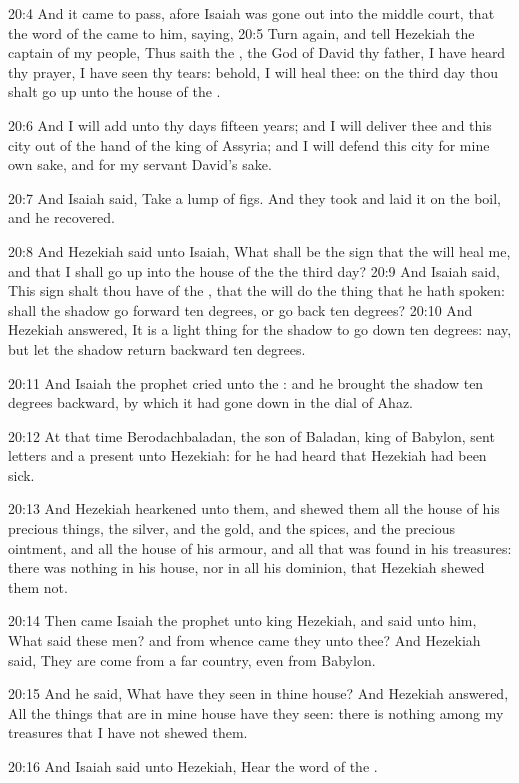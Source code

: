 20:4 And it came to pass, afore Isaiah was gone out into the middle
court, that the word of the \LORD came to him, saying, 20:5 Turn again,
and tell Hezekiah the captain of my people, Thus saith the \LORD, the
God of David thy father, I have heard thy prayer, I have seen thy
tears: behold, I will heal thee: on the third day thou shalt go up
unto the house of the \LORD.

20:6 And I will add unto thy days fifteen years; and I will deliver
thee and this city out of the hand of the king of Assyria; and I will
defend this city for mine own sake, and for my servant David's sake.

20:7 And Isaiah said, Take a lump of figs. And they took and laid it
on the boil, and he recovered.

20:8 And Hezekiah said unto Isaiah, What shall be the sign that the
\LORD will heal me, and that I shall go up into the house of the \LORD
the third day?  20:9 And Isaiah said, This sign shalt thou have of the
\LORD, that the \LORD will do the thing that he hath spoken: shall the
shadow go forward ten degrees, or go back ten degrees?  20:10 And
Hezekiah answered, It is a light thing for the shadow to go down ten
degrees: nay, but let the shadow return backward ten degrees.

20:11 And Isaiah the prophet cried unto the \LORD: and he brought the
shadow ten degrees backward, by which it had gone down in the dial of
Ahaz.

20:12 At that time Berodachbaladan, the son of Baladan, king of
Babylon, sent letters and a present unto Hezekiah: for he had heard
that Hezekiah had been sick.

20:13 And Hezekiah hearkened unto them, and shewed them all the house
of his precious things, the silver, and the gold, and the spices, and
the precious ointment, and all the house of his armour, and all that
was found in his treasures: there was nothing in his house, nor in all
his dominion, that Hezekiah shewed them not.

20:14 Then came Isaiah the prophet unto king Hezekiah, and said unto
him, What said these men? and from whence came they unto thee? And
Hezekiah said, They are come from a far country, even from Babylon.

20:15 And he said, What have they seen in thine house? And Hezekiah
answered, All the things that are in mine house have they seen: there
is nothing among my treasures that I have not shewed them.

20:16 And Isaiah said unto Hezekiah, Hear the word of the \LORD.

